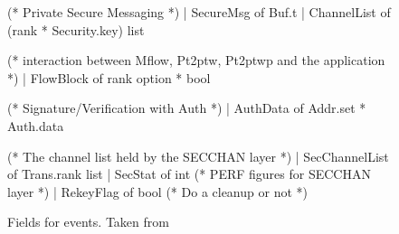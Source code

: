 \begin{figure}
\begin{codebox}
      (* Private Secure Messaging *)
  | SecureMsg of Buf.t
  | ChannelList of (rank * Security.key) list
	
      (* interaction between Mflow, Pt2ptw, Pt2ptwp and the application *)
  | FlowBlock of rank option * bool

      (* Signature/Verification with Auth *)
  | AuthData of Addr.set * Auth.data

      (* The channel list held by the SECCHAN layer *)
  | SecChannelList of Trans.rank list
  | SecStat of int              (* PERF figures for SECCHAN layer *)
  | RekeyFlag of bool           (* Do a cleanup or not *)
\end{codebox}
\caption{Fields for events.  Taken from }
\label{fig:extensions}
\end{figure}

